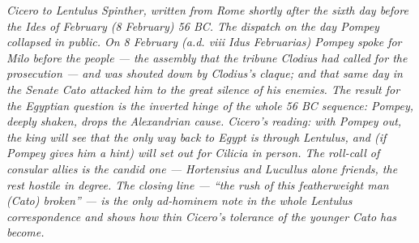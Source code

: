 
\textit{Cicero to Lentulus Spinther, written from Rome shortly
after the sixth day before the Ides of February (8 February)
56 BC. The dispatch on the day Pompey collapsed in public.
On 8 February (\textit{a.d. viii Idus Februarias}) Pompey
spoke for Milo before the people --- the assembly that the
tribune Clodius had called for the prosecution --- and was
shouted down by Clodius's claque; and that same day in the
Senate Cato attacked him to the great silence of his enemies.
The result for the Egyptian question is the inverted hinge
of the whole 56 BC sequence: Pompey, deeply shaken, drops
the Alexandrian cause. Cicero's reading: with Pompey out, the
king will see that the only way back to Egypt is through
Lentulus, and (if Pompey gives him a hint) will set out for
Cilicia in person. The roll-call of consular allies is the
candid one --- Hortensius and Lucullus alone friends, the
rest hostile in degree. The closing line --- ``the rush of
this featherweight man (Cato) broken'' --- is the only
ad-hominem note in the whole Lentulus correspondence and
shows how thin Cicero's tolerance of the younger Cato has
become.}
